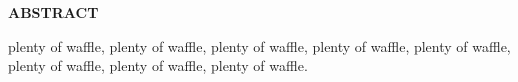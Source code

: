\begin{center}
{\Large \bf \uppercase{Abstract}}
\end{center}
plenty of waffle, plenty of waffle, plenty of waffle, plenty of waffle,
plenty of waffle, plenty of waffle, plenty of waffle, plenty of waffle.
